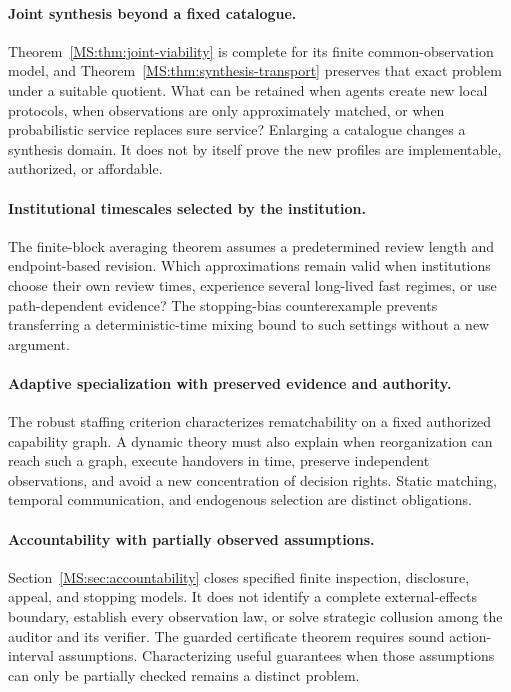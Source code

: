\paragraph{Joint synthesis beyond a fixed catalogue.}
Theorem~\ref{MS:thm:joint-viability} is complete for its finite common-observation model, and Theorem~\ref{MS:thm:synthesis-transport} preserves that exact problem under a suitable quotient. What can be retained when agents create new local protocols, when observations are only approximately matched, or when probabilistic service replaces sure service? Enlarging a catalogue changes a synthesis domain. It does not by itself prove the new profiles are implementable, authorized, or affordable.

\paragraph{Institutional timescales selected by the institution.}
The finite-block averaging theorem assumes a predetermined review length and endpoint-based revision. Which approximations remain valid when institutions choose their own review times, experience several long-lived fast regimes, or use path-dependent evidence? The stopping-bias counterexample prevents transferring a deterministic-time mixing bound to such settings without a new argument.

\paragraph{Adaptive specialization with preserved evidence and authority.}
The robust staffing criterion characterizes rematchability on a fixed authorized capability graph. A dynamic theory must also explain when reorganization can reach such a graph, execute handovers in time, preserve independent observations, and avoid a new concentration of decision rights. Static matching, temporal communication, and endogenous selection are distinct obligations.

\paragraph{Accountability with partially observed assumptions.}
Section~\ref{MS:sec:accountability} closes specified finite inspection, disclosure, appeal, and stopping models. It does not identify a complete external-effects boundary, establish every observation law, or solve strategic collusion among the auditor and its verifier. The guarded certificate theorem requires sound action-interval assumptions. Characterizing useful guarantees when those assumptions can only be partially checked remains a distinct problem.

